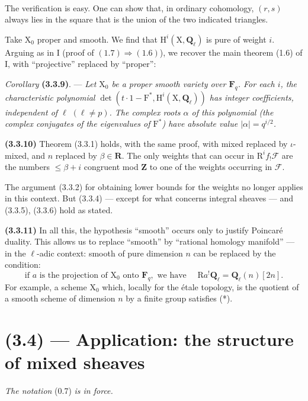 \documentclass[11pt,leqno]{article}
\newcommand{\Page}[1]{\ifvmode\noindent\else\unskip\ \fi{\footnotesize\textcolor{gray}{[p.\,#1]}}\ \ignorespaces}
\begin{document}
\Page{207}

The verification is easy. One can show that, in ordinary cohomology, \((r,s)\) always lies in the square that is the union of the two indicated triangles.

Take \(\mathrm{X}_0\) proper and smooth. We find that \(\mathrm{H}^i(\mathrm{X},\mathbf{Q}_\ell)\) is pure of weight \(i\). Arguing as in I (proof of \((1.7)\Rightarrow(1.6)\)), we recover the main theorem (1.6) of I, with “projective” replaced by “proper”:

\textit{Corollary} \textbf{(3.3.9)}. — \textit{Let \(\mathrm{X}_0\) be a proper smooth variety over \(\mathbf{F}_q\). For each \(i\), the characteristic polynomial \(\det(t\cdot1-\mathrm{F}^*,\mathrm{H}^i(\mathrm{X},\mathbf{Q}_\ell))\) has integer coefficients, independent of \(\ell\) \((\ell\neq p)\). The complex roots \(\alpha\) of this polynomial (the complex conjugates of the eigenvalues of \(\mathrm{F}^*\)) have absolute value \(|\alpha|=q^{i/2}\).}

\textbf{(3.3.10)} Theorem (3.3.1) holds, with the same proof, with mixed replaced by \(\iota\)-mixed, and \(n\) replaced by \(\beta\in\mathbf{R}\). The only weights that can occur in \(\mathrm{R}^if_!\mathscr{F}\) are the numbers \(\leq\beta+i\) congruent mod \(\mathbf{Z}\) to one of the weights occurring in \(\mathscr{F}\).

The argument (3.3.2) for obtaining lower bounds for the weights no longer applies in this context. But (3.3.4) — except for what concerns integral sheaves — and (3.3.5), (3.3.6) hold as stated.

\textbf{(3.3.11)} In all this, the hypothesis “smooth” occurs only to justify Poincaré duality. This allows us to replace “smooth” by “rational homology manifold” — in the \(\ell\)-adic context: smooth of pure dimension \(n\) can be replaced by the condition:
\[
\text{if }a\text{ is the projection of }\mathrm{X}_0
\text{ onto }\mathbf{F}_q,\text{ we have }\quad
\mathrm{R}a^!\mathbf{Q}_\ell=\mathbf{Q}_\ell(n)[2n].
\tag*{(*)}
\]
For example, a scheme \(\mathrm{X}_0\) which, locally for the étale topology, is the quotient of a smooth scheme of dimension \(n\) by a finite group satisfies (*).

\section*{(3.4) — Application: the structure of mixed sheaves}

\textit{The notation} (0.7) \textit{is in force.}
\end{document}
